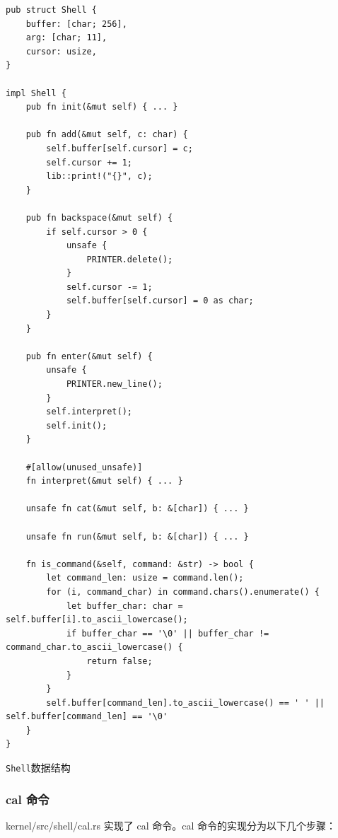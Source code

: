 \begin{listing}[htbp]
    \begin{verbatim}
pub struct Shell {
    buffer: [char; 256],
    arg: [char; 11],
    cursor: usize,
}

impl Shell {
    pub fn init(&mut self) { ... }

    pub fn add(&mut self, c: char) {
        self.buffer[self.cursor] = c;
        self.cursor += 1;
        lib::print!("{}", c);
    }

    pub fn backspace(&mut self) {
        if self.cursor > 0 {
            unsafe {
                PRINTER.delete();
            }
            self.cursor -= 1;
            self.buffer[self.cursor] = 0 as char;
        }
    }

    pub fn enter(&mut self) {
        unsafe {
            PRINTER.new_line();
        }
        self.interpret();
        self.init();
    }

    #[allow(unused_unsafe)]
    fn interpret(&mut self) { ... }

    unsafe fn cat(&mut self, b: &[char]) { ... }

    unsafe fn run(&mut self, b: &[char]) { ... }

    fn is_command(&self, command: &str) -> bool {
        let command_len: usize = command.len();
        for (i, command_char) in command.chars().enumerate() {
            let buffer_char: char = self.buffer[i].to_ascii_lowercase();
            if buffer_char == '\0' || buffer_char != command_char.to_ascii_lowercase() {
                return false;
            }
        }
        self.buffer[command_len].to_ascii_lowercase() == ' ' || self.buffer[command_len] == '\0'
    }
}
    \end{verbatim}
    \caption{\texttt{Shell}数据结构}\label{lst:ShellDataStructure}
\end{listing}

\subsubsection{cal 命令}

kernel/src/shell/cal.rs 实现了 cal 命令。cal 命令的实现分为以下几个步骤：

